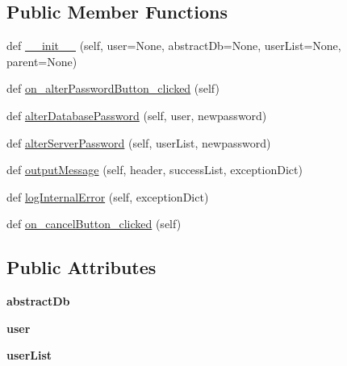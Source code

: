 \subsection*{Public Member Functions}
\begin{DoxyCompactItemize}
\item 
def \mbox{\hyperlink{class_dsg_tools_1_1_user_tools_1_1alter__user__password_1_1_alter_user_password_a22dee59df01decc76779e9ec8df1f384}{\+\_\+\+\_\+init\+\_\+\+\_\+}} (self, user=None, abstract\+Db=None, user\+List=None, parent=None)
\item 
def \mbox{\hyperlink{class_dsg_tools_1_1_user_tools_1_1alter__user__password_1_1_alter_user_password_a66ccfc8ce9d82457b05debdc463af7b4}{on\+\_\+alter\+Password\+Button\+\_\+clicked}} (self)
\item 
def \mbox{\hyperlink{class_dsg_tools_1_1_user_tools_1_1alter__user__password_1_1_alter_user_password_a5d124954fbc84be38fc2bca0975280da}{alter\+Database\+Password}} (self, user, newpassword)
\item 
def \mbox{\hyperlink{class_dsg_tools_1_1_user_tools_1_1alter__user__password_1_1_alter_user_password_afb5ca38a136f5c87ae6db893dc7bc697}{alter\+Server\+Password}} (self, user\+List, newpassword)
\item 
def \mbox{\hyperlink{class_dsg_tools_1_1_user_tools_1_1alter__user__password_1_1_alter_user_password_a16698954a9899247fd714679b28f62e6}{output\+Message}} (self, header, success\+List, exception\+Dict)
\item 
def \mbox{\hyperlink{class_dsg_tools_1_1_user_tools_1_1alter__user__password_1_1_alter_user_password_a364b941d46c8a291892bebbd1f462263}{log\+Internal\+Error}} (self, exception\+Dict)
\item 
def \mbox{\hyperlink{class_dsg_tools_1_1_user_tools_1_1alter__user__password_1_1_alter_user_password_ab79d6aed0dd3b452c10a13927c4b43b5}{on\+\_\+cancel\+Button\+\_\+clicked}} (self)
\end{DoxyCompactItemize}
\subsection*{Public Attributes}
\begin{DoxyCompactItemize}
\item 
\mbox{\label{class_dsg_tools_1_1_user_tools_1_1alter__user__password_1_1_alter_user_password_aadf4473a88e37e22b0cc2fc628573b7d}} 
{\bfseries abstract\+Db}
\item 
\mbox{\label{class_dsg_tools_1_1_user_tools_1_1alter__user__password_1_1_alter_user_password_a26ec48228ddd88bec182108c791413d6}} 
{\bfseries user}
\item 
\mbox{\label{class_dsg_tools_1_1_user_tools_1_1alter__user__password_1_1_alter_user_password_a9e5bfebf51d6841b3509692ee23746fd}} 
{\bfseries user\+List}
\end{DoxyCompactItemize}


